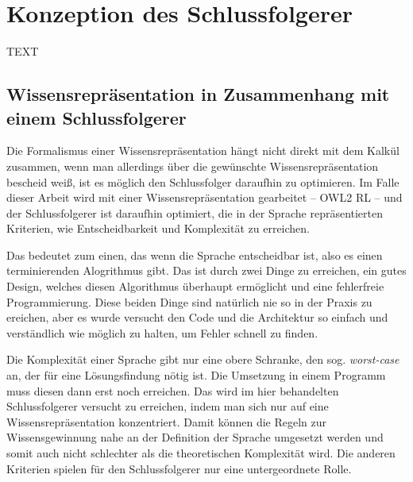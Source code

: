 \chapter{Konzeption des Schlussfolgerer}

TEXT



\section{Wissensrepräsentation in Zusammenhang mit einem Schlussfolgerer}

Die Formalismus einer Wissensrepräsentation hängt nicht direkt mit dem Kalkül zusammen, wenn man allerdings über die gewünschte Wissensrepräsentation bescheid weiß, ist es möglich den Schlussfolger daraufhin zu optimieren. Im Falle dieser Arbeit wird mit einer Wissensrepräsentation gearbeitet -- OWL2 RL -- und der Schlussfolgerer ist daraufhin optimiert, die in der Sprache repräsentierten Kriterien, wie Entscheidbarkeit und Komplexität zu erreichen.

Das bedeutet zum einen, das wenn die Sprache entscheidbar ist, also es einen terminierenden Alogrithmus gibt. Das ist durch zwei Dinge zu erreichen, ein gutes Design, welches diesen Algorithmus überhaupt ermöglicht und eine fehlerfreie Programmierung. Diese beiden Dinge sind natürlich nie so in der Praxis zu ereichen, aber es wurde versucht den Code und die Architektur so einfach und verständlich wie möglich zu halten, um Fehler schnell zu finden.

Die Komplexität einer Sprache gibt nur eine obere Schranke, den sog. \emph{worst-case} an, der für eine Lösungsfindung nötig ist. Die Umsetzung in einem Programm muss diesen dann erst noch erreichen. Das wird im hier behandelten Schlussfolgerer versucht zu erreichen, indem man sich nur auf eine Wissensrepräsentation konzentriert. Damit können die Regeln zur Wissensgewinnung nahe an der Definition der Sprache umgesetzt werden und somit auch nicht schlechter als die theoretischen Komplexität wird.
Die anderen Kriterien spielen für den Schlussfolgerer nur eine untergeordnete Rolle.





